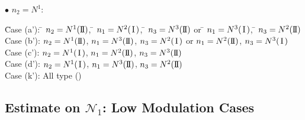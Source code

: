 \documentclass[11pt]{amsart}
\numberwithin{equation}{section} \numberwithin{theorem}{section}
\begin{document}
{
\noindent} $\bullet$ $n_2 = N^1$: 
\begin{tabbing}
	\hspace{7mm} \=Case (a'): \= $n_2 = N^1({\text{I \hspace{-2.8mm} I} })$, \= $n_1 = N^2({\hspace{0.5mm}\text{I}\hspace{0.5mm}})$, \= $n_3 = N^3({\text{I \hspace{-2.8mm} I} })$ or \= $n_1 = N^3({\hspace{0.5mm}\text{I}\hspace{0.5mm}})$, \= $n_3 = N^2({\text{I \hspace{-2.8mm} I} })$ \\
	
	\>Case (b'): \>$n_2 = N^1({\text{I \hspace{-2.8mm} I} })$, \>$n_1 = N^3({\text{I \hspace{-2.8mm} I} })$, \> $n_3 = N^2({\hspace{0.5mm}\text{I}\hspace{0.5mm}})$ or \>$n_1 = N^2({\text{I \hspace{-2.8mm} I} })$, \> $n_3 = N^3({\hspace{0.5mm}\text{I}\hspace{0.5mm}})$ \\
	
	\>Case (c'): \> $n_2 = N^1({\hspace{0.5mm}\text{I}\hspace{0.5mm}})$, \>$n_1 = N^2({\text{I \hspace{-2.8mm} I} })$, \>$n_3 = N^3({\text{I \hspace{-2.8mm} I} })$ \\
	
	\>Case (d'): \>$n_2 = N^1({\hspace{0.5mm}\text{I}\hspace{0.5mm}})$, \>$n_1 = N^3({\text{I \hspace{-2.8mm} I} })$, \>$n_3 = N^2({\text{I \hspace{-2.8mm} I} })$\\
	
	\>Case (k'): \>All type ({\hspace{0.5mm}\hspace{0.5mm}})
\end{tabbing}

\subsection{Estimate on $\mathcal{N}_1$: Low Modulation Cases} \label{SUBSEC:GWP5}
\end{document}
